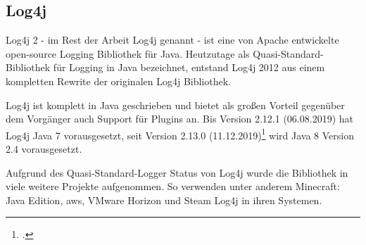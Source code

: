 
\subsection{Log4j}\label{subsec:log4j}
Log4j 2 - im Rest der Arbeit Log4j genannt - ist eine von Apache entwickelte open-source Logging Bibliothek für Java.
Heutzutage als Quasi-Standard-Bibliothek für Logging in Java bezeichnet, entstand Log4j 2012 aus einem kompletten Rewrite der originalen Log4j Bibliothek.

Log4j ist komplett in Java geschrieben und bietet als großen Vorteil gegenüber dem Vorgänger auch Support für Plugins an.
Bis Version 2.12.1 (06.08.2019) hat Log4j Java 7 vorausgesetzt, seit Version 2.13.0 (11.12.2019)\footcite{log4jChange} wird Java 8 Version 2.4 vorausgesetzt.

Aufgrund des Quasi-Standard-Logger Status von Log4j wurde die Bibliothek in viele weitere Projekte aufgenommen.
So verwenden unter anderem Minecraft: Java Edition, \gls{aws}, VMware Horizon und Steam Log4j in ihren Systemen.
